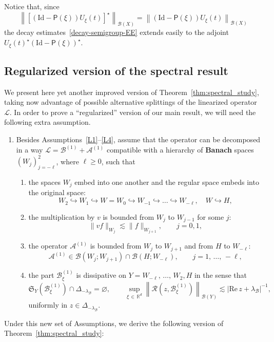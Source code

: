 \documentclass[AHL,Unicode,longabstracts,published]{cedram}
\newcommand{\Id}{\mathrm{Id}}
\newcommand{\re}{\mathrm{Re}\,}
\newcommand{\R}{\mathbb{R}}
\newcommand{\fkS}{\mathfrak{S}}
\renewcommand{\AA}{\mathcal{A}}
\newcommand{\BB}{\mathcal{B}}
\newcommand{\LL}{\mathcal{L}}
\newcommand{\PP}{\mathsf{P}}
\newcommand{\RR}{\mathcal{R}}
\newcommand{\BBB}{\mathscr{B}}
\newcommand{\Ss}{H}
\newcommand{\Sl}{X}
\newcommand{\Sg}{Y}
\newcommand{\Sr}{W}
\renewcommand*\ge{\geqslant}
\newcommand{\hypst}[1]{\textnormal{\textbf{#1}}}
\begin{document}
\begin{rema}
Notice that, since
\[
\left\|\left[\left(\Id-\PP(\xi)\right)U_{\xi}(t)\right]^{\star}\right\|_{\BBB(\Sl)}=\left\|\left(\Id-\PP(\xi)\right)U_{\xi}(t)\right\|_{\BBB(\Sl)}
\]
the decay estimates~\eqref{decay-semigroup-EE} extends easily to the adjoint $ U_{\xi}(t)^{\star} {(\Id - \PP(\xi))^{\star}}$.
\end{rema}

\subsection{Regularized version of the spectral result}\label{sec:LR}
We present here yet another improved version of Theorem~\ref{thm:spectral_study}, taking now advantage of possible alternative splittings of the linearized operator $\LL$. In order to prove a ``regularized'' version of our main result, we will need the following extra assumption.
\begin{enumerate}[label=\hypst{LR}]
\item \label{LR}
Besides Assumptions~\eqref{L1}--\eqref{L4}, assume that the operator can be decomposed in a way $\LL = \BB^{(1)} + \AA^{(1)}$ compatible with a hierarchy of \textbf{Banach} spaces $(\Sr_j)_{j=-\ell}^{2}$, where $\ell \ge 0$, such that
\begin{enumerate}
\item\label{LRa} the spaces $\Sr_j$ embed into one another and the regular space embeds into the original space:
\[
\Sr_2 \hookrightarrow \Sr_1 \hookrightarrow \Sr = \Sr_{0} \hookrightarrow \Sr_{-1} \hookrightarrow \dots \hookrightarrow \Sr_{-\ell}, \quad \Sr \hookrightarrow \Ss,
\]
\item\label{LRb} the multiplication by $v$ is bounded from $\Sr_{j}$ to $\Sr_{j-1}$ for some $j$:
\[
\|vf\|_{\Sr_{j}} \lesssim \|f\|_{\Sr_{j+1}}, \quad \quad j=0,1,
\]
\item \label{ass:reg_A_reg}
the operator $\AA^{(1)}$ is bounded from $\Sr_{j}$ to $\Sr_{j+1}$ and from $\Ss$ to $\Sr_{-\ell}$:
\[
\AA^{(1)} \in \BBB\left(\Sr_{j};\Sr_{j+1}\right) \cap \BBB(\Ss;\Sr_{-\ell}), \qquad j=1,\,\ldots,\,-\ell,
\]
\item \label{ass:reg_diss}
the part $\BB^{(1)}_{\xi}$ is dissipative on $\Sg = \Sr_{-\ell},\,\dots,\,\Sr_2, \Ss$ in the sense that
\[
\fkS_{\Sg}\left(\BB^{(1)}_{\xi}\right) \cap \Delta_{-\lambda_{\BB}} = \varnothing, \qquad \sup_{\xi\,\in\,\R^d}\left\|\RR\left(z,\BB^{(1)}_{\xi}\right)\right\|_{\BBB(\Sg)} \lesssim | \re z + \lambda_\BB|^{-1},
\]
uniformly in $z \in \Delta_{-\lambda_{\BB}}$.
\end{enumerate}
\end{enumerate}
Under this new set of Assumptions, we derive the following version of Theorem~\ref{thm:spectral_study}:
\end{document}
